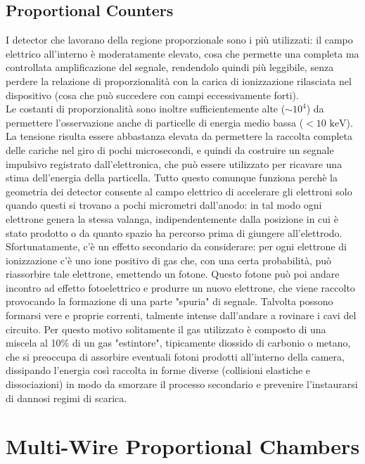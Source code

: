\documentclass[a4paper,11pt]{book}
\begin{document}
\subsection{Proportional Counters}
I detector che lavorano della regione proporzionale sono i più utilizzati: il campo elettrico all'interno è moderatamente elevato, cosa che permette una completa ma controllata amplificazione del segnale, rendendolo quindi più leggibile, senza perdere la relazione di proporzionalità con la carica di ionizzazione rilasciata nel dispositivo (cosa che può succedere con campi eccessivamente forti).\\
Le costanti di proporzionalità sono inoltre sufficientemente alte ($\sim 10^4$) da permettere l'osservazione anche di particelle di energia medio bassa ($<10\text{ keV}$).\\
La tensione risulta essere abbastanza elevata da permettere la raccolta completa delle cariche nel giro di pochi microsecondi, e quindi da costruire un segnale impulsivo registrato dall'elettronica, che può essere utilizzato per ricavare una stima dell'energia della particella. Tutto questo comunque funziona perchè la geometria dei detector consente al campo elettrico di accelerare gli elettroni solo quando questi si trovano a pochi micrometri dall'anodo: in tal modo ogni elettrone genera la stessa valanga, indipendentemente dalla posizione in cui è stato prodotto o da quanto spazio ha percorso prima di giungere all'elettrodo.\\ 
Sfortunatamente, c'è un effetto secondario da considerare: per ogni elettrone di ionizzazione c'è uno ione positivo di gas che, con una certa probabilità, può riassorbire tale elettrone, emettendo un fotone. Questo fotone può poi andare incontro ad effetto fotoelettrico e produrre un nuovo elettrone, che viene raccolto provocando la formazione di una parte "spuria" di segnale. Talvolta possono formarsi vere e proprie correnti, talmente intense dall'andare a rovinare i cavi del circuito. Per questo motivo solitamente il gas utilizzato è composto di una miscela al 10\% di un gas "estintore", tipicamente diossido di carbonio o metano, che si preoccupa di assorbire eventuali fotoni prodotti all'interno della camera, dissipando l'energia così raccolta in forme diverse (collisioni elastiche e dissociazioni) in modo da smorzare il processo secondario e prevenire l'instaurarsi di dannosi regimi di scarica.\\


\section{Multi-Wire Proportional Chambers}
\end{document}
